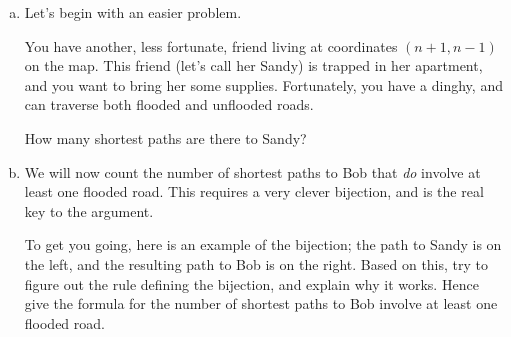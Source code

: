 \documentclass[12pt]{article}
\begin{document}
\begin{enumerate}[(a)]
    \item Let's begin with an easier problem. 

        You have another, less fortunate, friend living at coordinates $(n+1, n-1)$ on the map. 
        This friend (let's call her Sandy) is trapped in her apartment, and you want to bring her some supplies. Fortunately, you have a dinghy, and can traverse both flooded and unflooded roads.

        How many shortest paths are there to Sandy?

        \newpage

    \item We will now count the number of shortest paths to Bob that \emph{do} involve at least one flooded road. This requires a very clever bijection, and is the real key to the argument. 

        To get you going, here is an example of the bijection; the path to Sandy is on the left, and the resulting path to Bob is on the right. Based on this, try to figure out the rule defining the bijection, and explain why it works. 
        Hence give the formula for the number of shortest paths to Bob involve at least one flooded road.


\end{enumerate}
\end{document}
